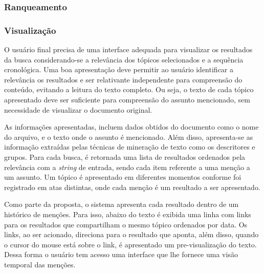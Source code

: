 \subsubsection{Ranqueamento}

\subsubsection{Visualização}

O usuário final precisa de uma interface adequada para visualizar os resultados da busca considerando-se a relevância dos tópicos selecionados e a sequência cronológica. Uma boa apresentação deve permitir ao usuário identificar a relevância os resultados e ser relativante independente para compreensão do conteúdo, evitando a leitura do texto completo. Ou seja, o texto de cada tópico apresentado deve ser suficiente para compreensão do assunto mencionado, sem necessidade de visualizar o documento original.

As informações apresentadas, incluem dados obtidos do documento como o nome do arquivo, e o texto onde o assunto é mencionado. Além disso, apresenta-se as informação extraídas pelas técnicas de mineração de texto como os descritores e grupos. Para cada busca, é retornada uma lista de resultados ordenados pela relevância com a \textit{string} de entrada, sendo cada item referente a uma menção a um assunto. Um tópico é apresentado em diferentes momentos conforme foi registrado em atas distintas, onde cada menção é um resultado a ser apresentado. 

Como parte da proposta, o sistema apresenta cada resultado dentro de um histórico de menções. Para isso, abaixo do texto é exibida uma linha com links para os resultados que compartilham o mesmo tópico ordenados por data. Os links, ao ser acionado, direciona para o resultado que aponta, além disso, quando o cursor do mouse está sobre o link, é apresentado um pre-visualização do texto. Dessa forma o usuário tem acesso uma interface que lhe fornece uma visão temporal das menções.









